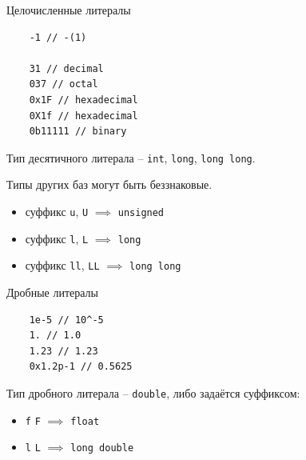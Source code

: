 \documentclass[unknownkeysallowed,xcolor=table]{beamer}
\begin{document}
\begin{frame}[fragile]{Целочисленные литералы}
  \begin{lstlisting}
    -1 // -(1)

    31 // decimal
    037 // octal
    0x1F // hexadecimal
    0X1f // hexadecimal
    0b11111 // binary
  \end{lstlisting}
  
  \vspace{1em}
  
  Тип десятичного литерала -- \lstinline{int}, \lstinline{long}, \lstinline{long long}. \\
  
  \vspace{1em}
  
  Типы других баз могут быть беззнаковые.
  \begin{itemize}
    \item суффикс \lstinline{u}, \lstinline{U} $\implies$ \lstinline{unsigned}
    \item суффикс \lstinline{l}, \lstinline{L} $\implies$ \lstinline{long}
    \item суффикс \lstinline{ll}, \lstinline{LL} $\implies$ \lstinline{long long}
  \end{itemize}
\end{frame}

\begin{frame}[fragile]{Дробные литералы}
  \begin{lstlisting}
    1e-5 // 10^-5
    1. // 1.0
    1.23 // 1.23
    0x1.2p-1 // 0.5625
  \end{lstlisting}
  
  \vspace{1em}
  
  Тип дробного литерала -- \lstinline{double}, либо задаётся суффиксом:
  
  \vspace{0.5em}
  \begin{itemize}
    \item \lstinline{f} \lstinline{F} $\implies$ \lstinline{float}
    \item \lstinline{l} \lstinline{L} $\implies$ \lstinline{long double}
  \end{itemize}
\end{frame}
\end{document}
